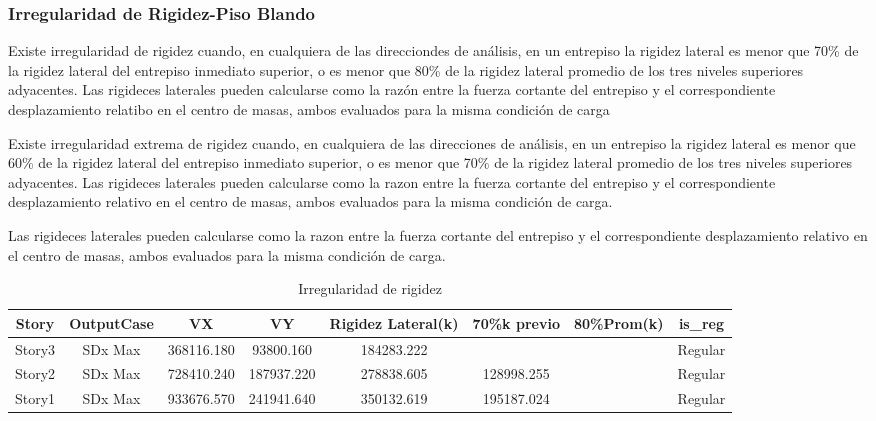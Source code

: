 \documentclass{article}%
\begin{document}
%
\subsubsection{Irregularidad de Rigidez-Piso Blando}%
\label{ssubsec:IrregularidaddeRigidez{-}PisoBlando}%
\begin{tcolorbox}[colback=gray!5!white,colframe=cyan!75!black,fonttitle=\bfseries,title=Tabla N°9 E-030]%
Existe irregularidad de rigidez cuando, en cualquiera de las direcciondes de análisis, en un entrepiso la rigidez lateral es menor que 70\% de la rigidez lateral del entrepiso inmediato superior, o es menor que 80\% de la rigidez lateral promedio de los tres niveles superiores adyacentes. 
 Las rigideces laterales pueden calcularse como la razón entre la fuerza cortante del entrepiso y el correspondiente desplazamiento relatibo en el centro de masas, ambos evaluados para la misma condición de carga %
\end{tcolorbox}%
\begin{tcolorbox}[colback=gray!5!white,colframe=cyan!75!black,fonttitle=\bfseries,title=Tabla N°9 E-030]%

Existe irregularidad extrema de rigidez cuando, en cualquiera de las direcciones de análisis, en un entrepiso la rigidez lateral es menor que 60\% de la rigidez lateral del entrepiso inmediato superior, o es menor que 70\% de la rigidez lateral promedio de los tres niveles superiores adyacentes.
Las rigideces laterales pueden calcularse como la razon entre la fuerza cortante del entrepiso y el correspondiente desplazamiento relativo en el centro de masas, ambos evaluados para la misma condición de carga.%
\end{tcolorbox}%
Las rigideces laterales pueden calcularse como la razon entre la fuerza cortante del entrepiso y el correspondiente desplazamiento relativo en el centro de masas, ambos evaluados para la misma condición de carga. 
\\%


\begin{table}[h!]%
\centering%
\caption{Irregularidad de rigidez}%
\begin{tabular}{cccccccc}
\toprule
Story & OutputCase & VX & VY & Rigidez Lateral(k) & 70\%k previo & 80\%Prom(k) & is\_reg \\
\midrule
Story3 & SDx Max & 368116.180 & 93800.160 & 184283.222 &  &  & Regular \\
Story2 & SDx Max & 728410.240 & 187937.220 & 278838.605 & 128998.255 &  & Regular \\
Story1 & SDx Max & 933676.570 & 241941.640 & 350132.619 & 195187.024 &  & Regular \\
\bottomrule
\end{tabular}
%
\end{table}
\end{document}
